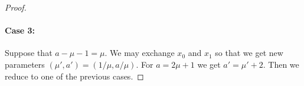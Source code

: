 \documentclass[twoside]{amsart}
\numberwithin{equation}{section}
\newcommand{\lieder}{\mathcal{L}}
\newcommand{\del}[1]{\frac{\partial}{\partial #1}}
\theoremstyle{definition}
\begin{document}
\begin{proof}
 \paragraph{\textbf{Case 3:}} Suppose that $a-\mu-1 = \mu$. We may exchange $x_0$ and $x_1$ so that we get new parameters $(\mu',a')= (1/\mu, a/\mu)$. For $a = 2\mu + 1$ we get $a' = \mu'+2$. Then we reduce to one of the previous cases. 
\end{proof}







\end{document}
